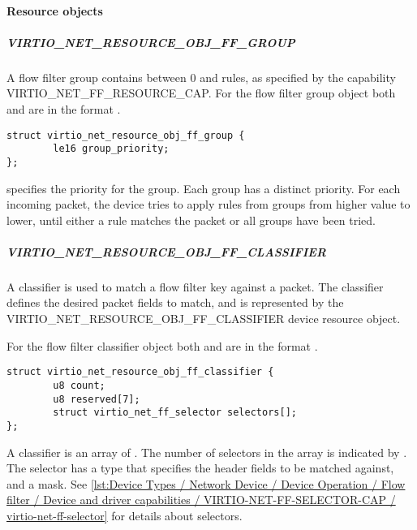 \paragraph{Resource objects}
\label{par:Device Types / Network Device / Device Operation / Flow filter / Resource objects}

\subparagraph{VIRTIO_NET_RESOURCE_OBJ_FF_GROUP}\label{par:Device Types / Network Device / Device Operation / Flow filter / Resource objects / VIRTIO-NET-RESOURCE-OBJ-FF-GROUP}

A flow filter group contains between 0 and  rules, as specified by the
capability VIRTIO_NET_FF_RESOURCE_CAP. For the flow filter group object both
 and
 are in the format
.

\begin{lstlisting}
struct virtio_net_resource_obj_ff_group {
        le16 group_priority;
};
\end{lstlisting}

 specifies the priority for the group. Each group has a
distinct priority. For each incoming packet, the device tries to apply rules
from groups from higher  value to lower, until either a
rule matches the packet or all groups have been tried.

\subparagraph{VIRTIO_NET_RESOURCE_OBJ_FF_CLASSIFIER}\label{par:Device Types / Network Device / Device Operation / Flow filter / Resource objects / VIRTIO-NET-RESOURCE-OBJ-FF-CLASSIFIER}

A classifier is used to match a flow filter key against a packet. The
classifier defines the desired packet fields to match, and is represented by
the VIRTIO_NET_RESOURCE_OBJ_FF_CLASSIFIER device resource object.

For the flow filter classifier object both  and
 are in the format
.

\begin{lstlisting}
struct virtio_net_resource_obj_ff_classifier {
        u8 count;
        u8 reserved[7];
        struct virtio_net_ff_selector selectors[];
};
\end{lstlisting}

A classifier is an array of . The number of selectors in the
array is indicated by . The selector has a type that specifies
the header fields to be matched against, and a mask.
See \ref{lst:Device Types / Network Device / Device Operation / Flow filter / Device and driver capabilities / VIRTIO-NET-FF-SELECTOR-CAP / virtio-net-ff-selector}
for details about selectors.

